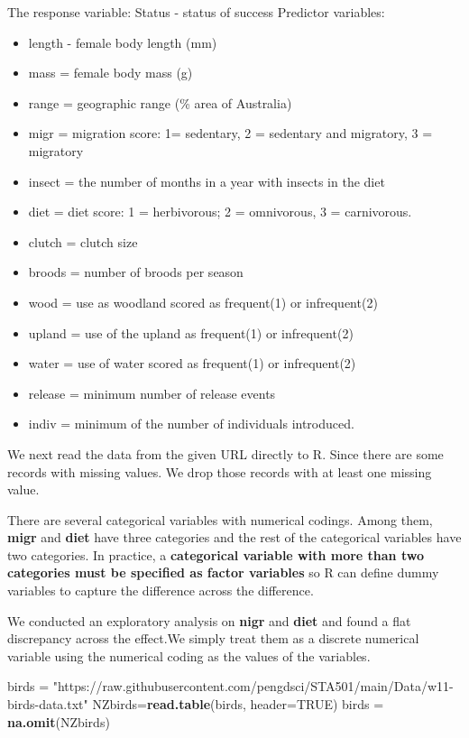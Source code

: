 \documentclass[
]{book}
\newenvironment{Shaded}{\begin{snugshade}}{\end{snugshade}}
\newcommand{\AttributeTok}[1]{\textcolor[rgb]{0.13,0.29,0.53}{#1}}
\newcommand{\ConstantTok}[1]{\textcolor[rgb]{0.56,0.35,0.01}{#1}}
\newcommand{\FunctionTok}[1]{\textcolor[rgb]{0.13,0.29,0.53}{\textbf{#1}}}
\newcommand{\NormalTok}[1]{#1}
\newcommand{\OtherTok}[1]{\textcolor[rgb]{0.56,0.35,0.01}{#1}}
\newcommand{\StringTok}[1]{\textcolor[rgb]{0.31,0.60,0.02}{#1}}
\providecommand{\tightlist}{%
  \setlength{\itemsep}{0pt}\setlength{\parskip}{0pt}}
\begin{document}
The response variable: Status - status of success
Predictor variables:

\begin{itemize}
\tightlist
\item
  length - female body length (mm)
\item
  mass = female body mass (g)
\item
  range = geographic range (\% area of Australia)
\item
  migr = migration score: 1= sedentary, 2 = sedentary and migratory, 3 = migratory
\item
  insect = the number of months in a year with insects in the diet
\item
  diet = diet score: 1 = herbivorous; 2 = omnivorous, 3 = carnivorous.
\item
  clutch = clutch size
\item
  broods = number of broods per season
\item
  wood = use as woodland scored as frequent(1) or infrequent(2)
\item
  upland = use of the upland as frequent(1) or infrequent(2)
\item
  water = use of water scored as frequent(1) or infrequent(2)
\item
  release = minimum number of release events
\item
  indiv = minimum of the number of individuals introduced.
\end{itemize}

We next read the data from the given URL directly to R. Since there are some records with missing values. We drop those records with at least one missing value.

There are several categorical variables with numerical codings. Among them, \textbf{migr} and \textbf{diet} have three categories and the rest of the categorical variables have two categories. In practice, a \textbf{categorical variable with more than two categories must be specified as factor variables} so R can define dummy variables to capture the difference across the difference.

We conducted an exploratory analysis on \textbf{nigr} and \textbf{diet} and found a flat discrepancy across the effect.We simply treat them as a discrete numerical variable using the numerical coding as the values of the variables.

\begin{Shaded}
\begin{Highlighting}[]
\NormalTok{birds }\OtherTok{=} \StringTok{"https://raw.githubusercontent.com/pengdsci/STA501/main/Data/w11{-}birds{-}data.txt"}
\NormalTok{NZbirds}\OtherTok{=}\FunctionTok{read.table}\NormalTok{(birds, }\AttributeTok{header=}\ConstantTok{TRUE}\NormalTok{)}
\NormalTok{birds }\OtherTok{=} \FunctionTok{na.omit}\NormalTok{(NZbirds)}
\end{Highlighting}
\end{Shaded}
\end{document}
